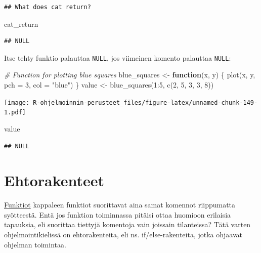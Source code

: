 \documentclass[
]{book}
\newenvironment{Shaded}{\begin{snugshade}}{\end{snugshade}}
\newcommand{\AttributeTok}[1]{\textcolor[rgb]{0.77,0.63,0.00}{#1}}
\newcommand{\CommentTok}[1]{\textcolor[rgb]{0.56,0.35,0.01}{\textit{#1}}}
\newcommand{\ControlFlowTok}[1]{\textcolor[rgb]{0.13,0.29,0.53}{\textbf{#1}}}
\newcommand{\DecValTok}[1]{\textcolor[rgb]{0.00,0.00,0.81}{#1}}
\newcommand{\FunctionTok}[1]{\textcolor[rgb]{0.00,0.00,0.00}{#1}}
\newcommand{\NormalTok}[1]{#1}
\newcommand{\OtherTok}[1]{\textcolor[rgb]{0.56,0.35,0.01}{#1}}
\newcommand{\SpecialCharTok}[1]{\textcolor[rgb]{0.00,0.00,0.00}{#1}}
\newcommand{\StringTok}[1]{\textcolor[rgb]{0.31,0.60,0.02}{#1}}
\begin{document}
\begin{verbatim}
## What does cat return?
\end{verbatim}

\begin{Shaded}
\begin{Highlighting}[]
\NormalTok{cat\_return}
\end{Highlighting}
\end{Shaded}

\begin{verbatim}
## NULL
\end{verbatim}

Itse tehty funktio palauttaa \texttt{NULL}, jos viimeinen komento palauttaa \texttt{NULL}:

\begin{Shaded}
\begin{Highlighting}[]
\CommentTok{\# Function for plotting blue squares}
\NormalTok{blue\_squares }\OtherTok{\textless{}{-}} \ControlFlowTok{function}\NormalTok{(x, y) \{}
  \FunctionTok{plot}\NormalTok{(x, y, }\AttributeTok{pch =} \DecValTok{3}\NormalTok{, }\AttributeTok{col =} \StringTok{"blue"}\NormalTok{)}
\NormalTok{\}}
\NormalTok{value }\OtherTok{\textless{}{-}} \FunctionTok{blue\_squares}\NormalTok{(}\DecValTok{1}\SpecialCharTok{:}\DecValTok{5}\NormalTok{, }\FunctionTok{c}\NormalTok{(}\DecValTok{2}\NormalTok{, }\DecValTok{5}\NormalTok{, }\DecValTok{3}\NormalTok{, }\DecValTok{3}\NormalTok{, }\DecValTok{8}\NormalTok{))}
\end{Highlighting}
\end{Shaded}

\texttt{[image: R-ohjelmoinnin-perusteet\_files/figure-latex/unnamed-chunk-149-1.pdf]}

\begin{Shaded}
\begin{Highlighting}[]
\NormalTok{value}
\end{Highlighting}
\end{Shaded}

\begin{verbatim}
## NULL
\end{verbatim}

\hypertarget{ifelse}{%
\chapter{Ehtorakenteet}\label{ifelse}}

\protect\hyperlink{functions}{Funktiot} kappaleen funktiot suorittavat aina samat komennot riippumatta syötteestä. Entä jos funktion toiminnassa pitäisi ottaa huomioon erilaisia tapauksia, eli suorittaa tiettyjä komentoja vain joissain tilanteissa? Tätä varten ohjelmointikielissä on ehtorakenteita, eli ns. if/else-rakenteita, jotka ohjaavat ohjelman toimintaa.
\end{document}
